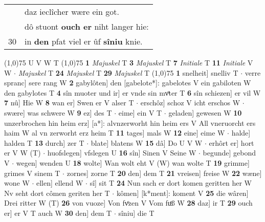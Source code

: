 \documentclass[8pt,a4paper,notitlepage]{article}
\begin{document}
\begin{table}[ht]
\begin{minipage}[t]{0.5\linewidth}
\begin{tabular}{rl}
 & daz ieclîcher wære ein got.\\ 
 & dô stuont \textbf{ouch er} niht langer hie:\\ 
30 & in \textbf{den} pfat viel er ûf \textbf{sîniu} knie.\\ 
\end{tabular}
\scriptsize
\line(1,0){75} \newline
U V W T \newline
\line(1,0){75} \newline
\textbf{1} \textit{Majuskel} T  \textbf{3} \textit{Majuskel} T  \textbf{7} \textit{Initiale} T  \textbf{11} \textit{Initiale} V W   $\cdot$ \textit{Majuskel} T  \textbf{24} \textit{Majuskel} T  \textbf{29} \textit{Majuskel} T  \newline
\line(1,0){75} \newline
\textbf{1} snelheit] snelliv T  $\cdot$ verre spranc] sere rang W \textbf{2} gabylôten] den [gabelote*]: gabelotes V ein gabiloten W den gabylotes T \textbf{4} sîn muoter und ir] er vnde sin mvͦter T \textbf{6} sîn schiezen] er vil W \textbf{7} nû] Hie W \textbf{8} wan er] Swen er V alser T  $\cdot$ erschôz] schoz V icht erschos W  $\cdot$ swære] was schwere W \textbf{9} ez] des T  $\cdot$ eime] ein V T  $\cdot$ geladen] gewesen W \textbf{10} unzerbrochen hin heim erz] [a*]: alvnzerworht hin heim ers V All vneruorcht ers haim W al vn zerworht erz heim T \textbf{11} tages] mals W \textbf{12} eine] eime W  $\cdot$ halde] halden T \textbf{13} durch] zer T  $\cdot$ blate] blatens W \textbf{15} dâ] Do U V W  $\cdot$ erhôrt er] hort er V W (T)  $\cdot$ huofslegen] vfslegen U \textbf{16} sîn] Sinen V Seine W  $\cdot$ begunde] gebond V  $\cdot$ wegen] wenden U \textbf{18} wolte] Wan wolt eht V (W) wan wolte T \textbf{19} grimme] grimes V sinem T  $\cdot$ zornes] zorne T \textbf{20} den] dem T \textbf{21} vreisen] freise W \textbf{22} wæne] wone W  $\cdot$ ellen] ellend W  $\cdot$ sî] sit T \textbf{24} Nun sach er dort komen geritten her W Nv seht dort cômen geriten her T  $\cdot$ kômen] [k*ment]: koment V \textbf{25} die wâren] Drei ritter W (T) \textbf{26} von vuoze] Von fvͦzen V Vom fuͦß W \textbf{28} daz] ir T \textbf{29} ouch er] er V T auch W \textbf{30} den] dem T  $\cdot$ sîniu] die T \newline
\end{minipage}
\end{table}
\end{document}
